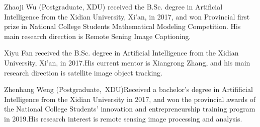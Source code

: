 \documentclass[journal]{IEEEtran}
\begin{document}
 \begin{IEEEbiography}{Zhaoji Wu}
(Postgraduate, XDU) received the B.Sc. degree in Artificial Intelligence from the Xidian University, Xi'an, in 2017, and won Provincial first prize in  National College Students Mathematical Modeling Competition. His main research direction is Remote Sening Image Captioning.
\end{IEEEbiography}

  \begin{IEEEbiography}{Xiyu Fan}
	received the B.Sc. degree in Artificial Intelligence from the Xidian University, Xi’an, in 2017.His current mentor is Xiangrong Zhang, and his main research direction is satellite image object tracking.
 \end{IEEEbiography}

 \begin{IEEEbiography}{Zhenhang Weng}
(Postgraduate,~XDU)Received a bachelor's degree in Artifificial Intelligence from the Xidian University in 2017, and won the provincial awards of the National College Students' innovation and entrepreneurship training program in 2019.His research interest is remote sensing image processing and analysis.
\end{IEEEbiography}
\end{document}

